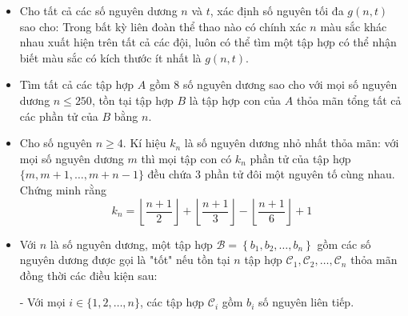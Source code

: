 \documentclass[11pt]{scrartcl}
\begin{document}
\begin{itemize}[label=, leftmargin=0em, itemsep=-0em]
    \item \begin{btvn}
        Cho tất cả các số nguyên dương $n$ và $t$, xác định số nguyên tối đa $g(n, t)$ sao cho: Trong bất kỳ liên đoàn thể thao nào có chính xác $n$ màu sắc khác nhau xuất hiện trên tất cả các đội, luôn có thể tìm một tập hợp có thể nhận biết màu sắc có kích thước ít nhất là $g(n, t)$.
    \end{btvn}
    \item \begin{btvn}
        Tìm tất cả các tập hợp $A$ gồm 8 số nguyên dương sao cho với mọi số nguyên dương $n \leq 250$, tồn tại tập hợp $B$ là tập hợp con của $A$ thỏa mãn tổng tất cả các phần tử của $B$ bằng $n$.
    \end{btvn}
    \item \begin{btvn}
        Cho số nguyên $n \geq 4$. Kí hiệu $k_n$ là số nguyên dương nhỏ nhất thỏa mãn: với mọi số nguyên dương $m$ thì mọi tập con có $k_n$ phần tử của tập hợp $\{m, m + 1, \dots, m + n - 1\}$ đều chứa 3 phần tử đôi một nguyên tố cùng nhau. Chứng minh rằng
        \[
            k_n = \left\lfloor \frac{n + 1}{2}\right\rfloor + \left\lfloor \frac{n + 1}{3}\right\rfloor - \left\lfloor \frac{n + 1}{6}\right\rfloor + 1
        \]
    \end{btvn}
    \item \begin{btvn}
        Với $n$ là số nguyên dương, một tập hợp $\mathcal{B}=\left\{b_1, b_2, \ldots, b_n\right\}$ gồm các số nguyên dương được gọi là "tốt" nếu tồn tại $n$ tập hợp $\mathcal{C}_1, \mathcal{C}_2, \ldots, \mathcal{C}_n$ thỏa mãn đồng thời các điều kiện sau:

        - Với mọi $i \in\{1,2, \ldots, n\}$, các tập hợp $\mathcal{C}_i$ gồm $b_i$ số nguyên liên tiếp.


\end{btvn}
\end{itemize}
\end{document}
